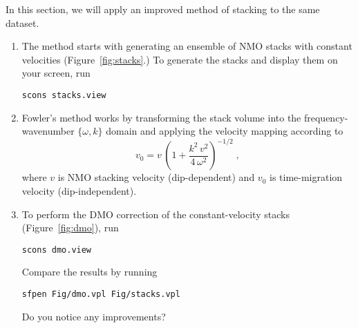 In this section, we will apply an improved method of stacking
\cite[]{Fowler.sepphd.58} to the same dataset.
\begin{enumerate}
\item The method starts with generating an ensemble of NMO stacks with constant velocities (Figure~\ref{fig:stacks}.)
To generate the stacks and display them on your screen, run
\begin{verbatim}
scons stacks.view
\end{verbatim}
\item Fowler's method works by transforming the stack volume into the frequency-wavenumber $\{\omega,k\}$ 
domain and applying the velocity mapping according to
\begin{equation}
\label{eq:fowler}
v_0 = \displaystyle v\,\left(1+\frac{k^2\,v^2}{4\,\omega^2}\right)^{-1/2}\;,
\end{equation}
where $v$ is NMO stacking velocity (dip-dependent) and $v_0$ is time-migration velocity (dip-independent).
\item To perform the DMO correction of the constant-velocity stacks (Figure~\ref{fig:dmo}), run
\begin{verbatim}
scons dmo.view
\end{verbatim}
Compare the results by running
\begin{verbatim}
sfpen Fig/dmo.vpl Fig/stacks.vpl
\end{verbatim}
Do you notice any improvements?

\answer{

}



\end{enumerate}
